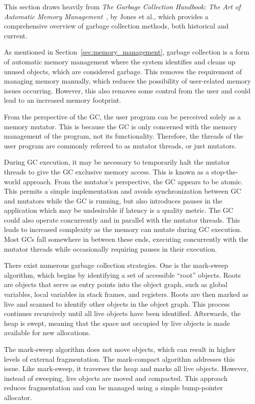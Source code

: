 
This section draws heavily from \textit{The Garbage Collection Handbook: The Art of Automatic Memory Management}~\cite{gchandbook}, by Jones et al., which provides a comprehensive overview of garbage collection methods, both historical and current.

As mentioned in Section~\ref{sec:memory_management}, garbage collection is a form of automatic memory management where the system identifies and cleans up unused objects, which are considered garbage. This removes the requirement of managing memory manually, which reduces the possibility of user-related memory issues occurring. However, this also removes some control from the user and could lead to an increased memory footprint.

From the perspective of the GC, the user program can be perceived solely as a memory mutator. This is because the GC is only concerned with the memory management of the program, not its functionality. Therefore, the threads of the user program are commonly referred to as mutator threads, or just mutators.

During GC execution, it may be necessary to temporarily halt the mutator threads to give the GC exclusive memory access. This is known as a stop-the-world approach. From the mutator's perspective, the GC appears to be atomic. This permits a simple implementation and avoids synchronization between GC and mutators while the GC is running, but also introduces pauses in the application which may be undesirable if latency is a quality metric. The GC could also operate concurrently and in parallel with the mutator threads. This leads to increased complexity as the memory can mutate during GC execution. Most GCs fall somewhere in between these ends, executing concurrently with the mutator threads while occasionally requiring pauses in their execution.

There exist numerous garbage collection strategies. One is the mark-sweep algorithm, which begins by identifying a set of accessible ``root'' objects. Roots are objects that serve as entry points into the object graph, such as global variables, local variables in stack frames, and registers. Roots are then marked as live and scanned to identify other objects in the object graph. This process continues recursively until all live objects have been identified. Afterwards, the heap is swept, meaning that the space not occupied by live objects is made available for new allocations.

The mark-sweep algorithm does not move objects, which can result in higher levels of external fragmentation. The mark-compact algorithm addresses this issue. Like mark-sweep, it traverses the heap and marks all live objects. However, instead of sweeping, live objects are moved and compacted. This approach reduces fragmentation and can be managed using a simple bump-pointer allocator. 

